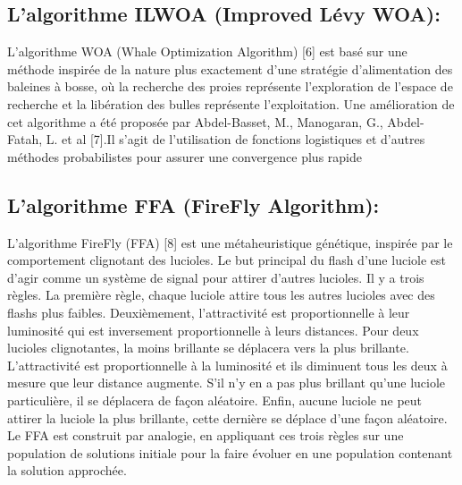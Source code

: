\documentclass[class=report, crop=false]{standalone}
\begin{document}
        \subsection{L’algorithme ILWOA (Improved Lévy WOA): }
        L’algorithme WOA (Whale Optimization Algorithm) [6] est basé sur une méthode inspirée de la nature plus exactement d’une stratégie d’alimentation des baleines à bosse, où la recherche des proies représente l’exploration de l’espace de recherche et la libération des bulles représente l’exploitation.
Une amélioration de cet algorithme a été proposée par Abdel-Basset, M., Manogaran, G., Abdel-Fatah, L. et al [7].Il s’agit de l’utilisation de fonctions logistiques et d’autres méthodes probabilistes pour assurer une convergence plus rapide
        \subsection{L’algorithme FFA (FireFly Algorithm): }
        L'algorithme FireFly (FFA) [8] est une métaheuristique génétique, inspirée par le comportement clignotant des lucioles. Le but principal du flash d'une luciole est d'agir comme un système de signal pour attirer d'autres lucioles. Il y a trois règles. La première règle, chaque luciole attire tous les autres lucioles avec des flashs plus faibles. Deuxièmement, l'attractivité est proportionnelle à leur luminosité qui est inversement proportionnelle à leurs distances. Pour deux lucioles clignotantes, la moins brillante se déplacera vers la plus brillante. L'attractivité est proportionnelle à la luminosité et ils diminuent tous les deux à mesure que leur distance augmente. S'il n'y en a pas plus brillant qu'une luciole particulière, il se déplacera de façon aléatoire. Enfin, aucune luciole ne peut attirer la luciole la plus brillante, cette dernière se déplace d’une façon aléatoire. Le FFA est construit par analogie, en appliquant ces trois règles sur une population de solutions initiale pour la faire évoluer en une population contenant la solution approchée.
\end{document}
